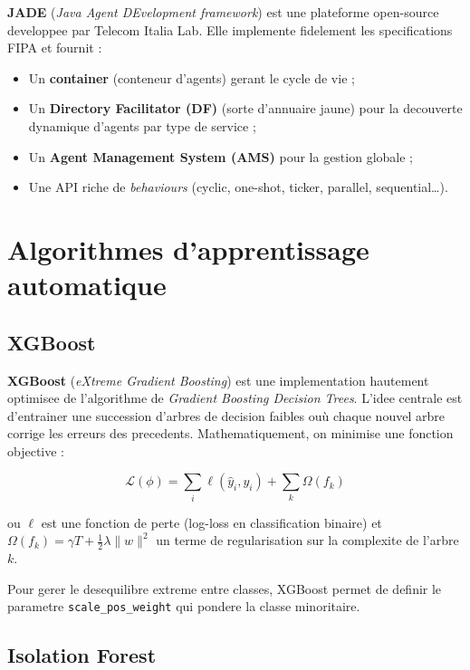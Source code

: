 \documentclass[12pt,a4paper,oneside]{report}
\begin{document}
\textbf{JADE} (\emph{Java Agent DEvelopment framework}) est une plateforme
open-source developpee par Telecom Italia Lab. Elle implemente fidelement les
specifications FIPA et fournit :

\begin{itemize}[leftmargin=*]
  \item Un \textbf{container} (conteneur d'agents) gerant le cycle de vie ;
  \item Un \textbf{Directory Facilitator (DF)} (sorte d'annuaire jaune) pour
        la decouverte dynamique d'agents par type de service ;
  \item Un \textbf{Agent Management System (AMS)} pour la gestion globale ;
  \item Une API riche de \emph{behaviours} (cyclic, one-shot, ticker, parallel,
        sequential\dots).
\end{itemize}

\section{Algorithmes d'apprentissage automatique}

\subsection{XGBoost}

\textbf{XGBoost} (\emph{eXtreme Gradient Boosting}) \cite{chen2016xgboost} est
une implementation hautement optimisee de l'algorithme de \emph{Gradient
Boosting Decision Trees}. L'idee centrale est d'entrainer une succession
d'arbres de decision faibles ou\`u chaque nouvel arbre corrige les erreurs des
precedents. Mathematiquement, on minimise une fonction objective :

\begin{equation}
  \mathcal{L}(\phi) = \sum_{i} \ell(\hat{y}_i, y_i) + \sum_{k} \Omega(f_k)
\end{equation}

ou $\ell$ est une fonction de perte (log-loss en classification binaire) et
$\Omega(f_k) = \gamma T + \frac{1}{2}\lambda \lVert w \rVert^2$ un terme de
regularisation sur la complexite de l'arbre $k$.

Pour gerer le desequilibre extreme entre classes, XGBoost permet de definir le
parametre \texttt{scale\_pos\_weight} qui pondere la classe minoritaire.

\subsection{Isolation Forest}
\end{document}
